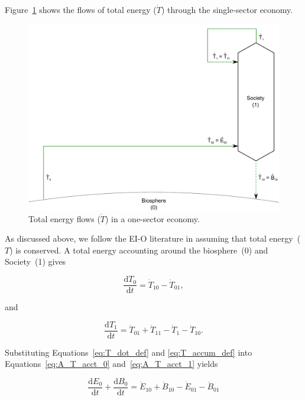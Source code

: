 Figure~\ref{fig:A_total_energy_T_dot} shows the flows 
of total energy ($\dot{T}$) through the single-sector economy.

\begin{figure}[!ht]
\includegraphics[width=1.0\linewidth]{Part_1/Chapter_Embodied/images/1_sector_embodied_energy.pdf}
\caption[Total energy flows in a one-sector economy]{Total energy flows ($\dot{T}$) in a one-sector economy.}
\label{fig:A_total_energy_T_dot}
\end{figure}

As discussed above, we follow the EI-O literature in assuming that 
total energy~($T$) is conserved. 
A total energy accounting around the biosphere~(0)
and Society~(1) gives

\begin{equation} \label{eq:A_T_acct_0}
	\frac{\mathrm{d}T_{0}}{\mathrm{d}t} 
	= \dot{T}_{10} 
	- \dot{T}_{01},
\end{equation}

\noindent and

\begin{equation} \label{eq:A_T_acct_1}
	\frac{\mathrm{d}T_{1}}{\mathrm{d}t} 
	= \dot{T}_{01} 
	+ \dot{T}_{11}
	- \dot{T}_{1}
	- \dot{T}_{10}.
\end{equation}

Substituting Equations~\ref{eq:T_dot_def} and
\ref{eq:T_accum_def} into 
Equations~\ref{eq:A_T_acct_0} and~\ref{eq:A_T_acct_1}
yields

\begin{equation} \label{eq:A_total_energy_0}
	\frac{\mathrm{d}E_{0}}{\mathrm{d}t} 
	+ \frac{\mathrm{d}B_{0}}{\mathrm{d}t} 
	= \dot{E}_{10} 
	+ \dot{B}_{10} 
	- \dot{E}_{01}
	- \dot{B}_{01}
\end{equation}

